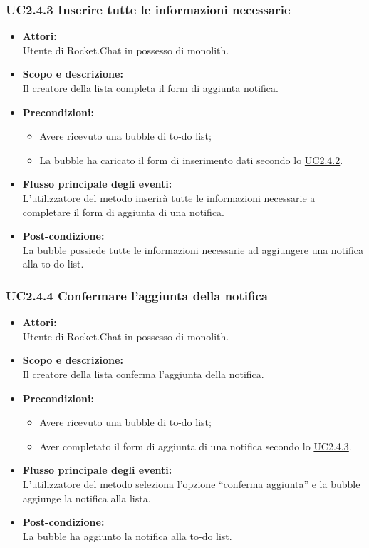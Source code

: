 \subsubsection{UC2.4.3 Inserire tutte le informazioni necessarie} \label{UC2.4.3}

\begin{itemize}
	\item \textbf{Attori:}
	\\Utente di Rocket.Chat in possesso di monolith.
	\item \textbf{Scopo e descrizione:} 
	\\Il creatore della lista completa il form di aggiunta notifica.
	\item \textbf{Precondizioni:}
	\begin{itemize}
		\item Avere ricevuto una bubble di to-do list;
		\item La bubble ha caricato il form di inserimento dati secondo lo \hyperref[UC2.4.2]{UC2.4.2}.
	\end{itemize}
	\item \textbf{Flusso principale degli eventi:}
	\\L’utilizzatore del metodo inserirà tutte le informazioni necessarie a completare il form di aggiunta di una notifica.
	\item \textbf{Post-condizione:}
	\\La bubble possiede tutte le informazioni necessarie ad aggiungere una notifica alla to-do list.
\end{itemize}

\subsubsection{UC2.4.4 Confermare l’aggiunta della notifica} \label{UC2.4.4}

\begin{itemize}
	\item \textbf{Attori:}
	\\Utente di Rocket.Chat in possesso di monolith.
	\item \textbf{Scopo e descrizione:} 
	\\Il creatore della lista conferma l’aggiunta della notifica.
	\item \textbf{Precondizioni:}
	\begin{itemize}
		\item Avere ricevuto una bubble di to-do list;
		\item Aver completato il form di aggiunta di una notifica secondo lo \hyperref[UC2.4.3]{UC2.4.3}.
	\end{itemize}
	\item \textbf{Flusso principale degli eventi:}
	\\L’utilizzatore del metodo seleziona l’opzione “conferma aggiunta” e la bubble aggiunge la notifica alla lista.
	\item \textbf{Post-condizione:}
	\\La bubble ha aggiunto la notifica alla to-do list.
\end{itemize}

